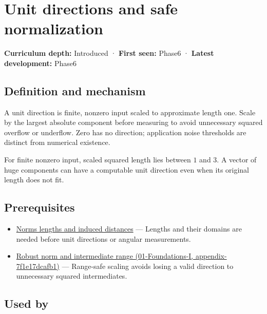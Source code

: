 \hypertarget{appendix-f744e41b95b4}{}
\section{Unit directions and safe normalization}\label{appendix-f744e41b95b4-unit-directions-and-safe-normalization}

\textbf{Curriculum depth:} Introduced · \textbf{First seen:} Phase6 · \textbf{Latest development:} Phase6

\subsection{Definition and mechanism}\label{appendix-f744e41b95b4-definition-and-mechanism}

A unit direction is finite, nonzero input scaled to approximate length one. Scale by the largest absolute component before measuring to avoid unnecessary squared overflow or underflow. Zero has no direction; application noise thresholds are distinct from numerical existence.

For finite nonzero input, scaled squared length lies between \(1\) and \(3\). A vector of huge components can have a computable unit direction even when its original length does not fit.

\subsection{Prerequisites}\label{appendix-f744e41b95b4-prerequisites}

\begin{itemize}
\tightlist
\item
  \hyperref[appendix-49933872bb51]{Norms lengths and induced distances} --- Lengths and their domains are needed before unit directions or angular measurements.
\item
  \href{../01-Foundations-I/main.pdf\#nameddest=appendix-7f1e17dcafb1}{Robust norm and intermediate range (01-Foundations-I, appendix-7f1e17dcafb1)} --- Range-safe scaling avoids losing a valid direction to unnecessary squared intermediates.
\end{itemize}

\subsection{Used by}\label{appendix-f744e41b95b4-used-by}

